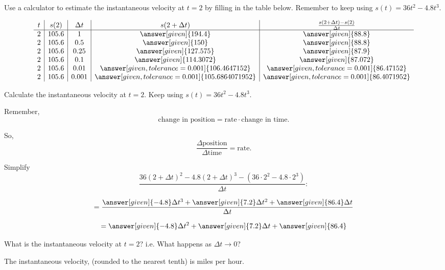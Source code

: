 \documentclass{ximera}
\begin{document}
\begin{problem}
  Use a calculator to estimate the instantaneous velocity at $t=2$ by filling in the table below. Remember to keep using $s(t)=36t^2-4.8t^3$.
  
  \[
\begin{array}{c|c|c|c|c}
 t & s(2) & \Delta t & s(2+\Delta t) & \frac{s(2+\Delta t)-s(2)}{\Delta t}\\ \hline
2 & 105.6 & 1 & \answer[given]{194.4} & \answer[given]{88.8}\\
2 & 105.6 & 0.5 & \answer[given]{150} & \answer[given]{88.8}\\
2 & 105.6 & 0.25 & \answer[given]{127.575} & \answer[given]{87.9}\\
2 & 105.6 & 0.1 & \answer[given]{114.3072} & \answer[given]{87.072}\\
2 & 105.6 & 0.01 & \answer[given, tolerance=0.001]{106.4647152} & \answer[given, tolerance=0.001]{86.47152}\\
2 & 105.6 & 0.001 & \answer[given, tolerance=0.001]{105.6864071952} & \answer[given, tolerance=0.001]{86.4071952}\\
\end{array}
\]

\end{problem}

\begin{problem}
  Calculate the instantaneous velocity at $t=2$. Keep using $s(t)=36t^2-4.8t^3$.
  \begin{hint}
    Remember, 
    \[
    \text{change in position} = \text{rate}\cdot\text{change in time}.
    \]
  \end{hint}
  \begin{hint}
    So, 
    \[
    \frac{\Delta\text{position}}{\Delta\text{time}} = \text{rate}.
    \]
  \end{hint}
  \begin{hint}
    Simplify
    \[
    \frac{36(2+\Delta t)^2 -4.8(2+\Delta t)^3 -\left(36\cdot 2^2 -4.8\cdot 2^3\right) }{\Delta t}:
    \]
    
    \[
    =\frac{\answer[given]{-4.8}\Delta t^3+\answer[given]{7.2}\Delta t^2+\answer[given]{86.4}\Delta t}{\Delta t}
    \]
    
    \[
    =\answer[given]{-4.8}\Delta t^2+\answer[given]{7.2}\Delta t+\answer[given]{86.4}
    \]
    
    What is the instantaneous velocity at $t=2$? i.e. What happens as $\Delta t\rightarrow 0$?
    
  \end{hint}
  \begin{prompt}
    The instantaneous velocity, (rounded to the nearest tenth) is  miles per hour.
  \end{prompt}
\end{problem}
\end{document}
